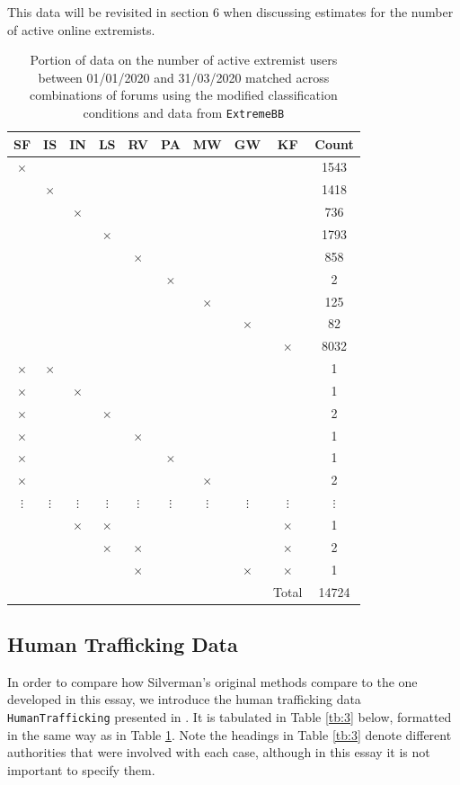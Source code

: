 \documentclass[10pt,a4paper,notitlepage]{article}
\begin{document}
This data will be revisited in section 6 when discussing estimates for the number of active online extremists.

\begin{table}[H]
\centering
\begin{tabular}{|ccccccccc|c|}
\hline SF & IS & IN & LS & RV & PA & MW & GW & KF & Count \\ \hline
$\times$&&&&&&&&& 1543\\
&$\times$&&&&&&&& 1418\\
&&$\times$&&&&&&& 736\\
&&&$\times$&&&&&& 1793\\
&&&&$\times$&&&&& 858\\
&&&&&$\times$&&&& 2\\
&&&&&&$\times$&&& 125\\
&&&&&&&$\times$&& 82\\
&&&&&&&&$\times$& 8032\\ \hline
$\times$&$\times$&&&&&&&& 1\\
$\times$&&$\times$&&&&&&& 1\\
$\times$&&&$\times$&&&&&& 2\\
$\times$&&&&$\times$&&&&& 1\\
$\times$&&&&&$\times$&&&& 1\\
$\times$&&&&&&$\times$&&& 2\\ 
$\vdots$&$\vdots$&$\vdots$&$\vdots$&$\vdots$&$\vdots$&$\vdots$&$\vdots$&$\vdots$&$\vdots$\\
&&$\times$&$\times$&&&&&$\times$&1\\
&&&$\times$&$\times$&&&&$\times$ &2\\
&&&&$\times$&&&$\times$&$\times$&1\\ \hline
&&&&&&&&Total&14724\\ \hline
\end{tabular}
\caption{Portion of data on the number of active extremist users between 01/01/2020 and 31/03/2020 matched across combinations of forums using the modified classification conditions and data from \texttt{ExtremeBB}}\label{tb:1}
\end{table}
\subsection{Human Trafficking Data}
In order to compare how Silverman's original methods compare to the one developed in this essay, we introduce the human trafficking data \texttt{HumanTrafficking} presented in \cite{Silver}. It is tabulated in Table \ref{tb:3} below, formatted in the same way as in Table \ref{tb:1}. Note the headings in Table \ref{tb:3} denote different authorities that were involved with each case, although in this essay it is not important to specify them. 
\end{document}
